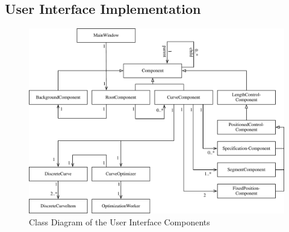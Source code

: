 \documentclass[a4paper]{article}
\begin{document}
					
					
			\subsection{User Interface Implementation}
				\begin{figure}[htb]
					\centering
					\includegraphics[width=\textwidth]{content/output/ui_components_class_diagram.pdf}
					\caption{Class Diagram of the User Interface Components}
					\label{figure:ui_components_class_diagram}
				\end{figure}
				
\end{document}
